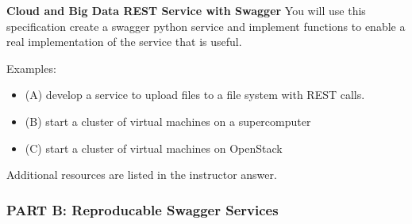\begin{exercise} {\bf Cloud and Big Data REST Service with Swagger}
 You will use this specification create a swagger python service and
 implement functions to enable a real implementation of the service
 that is useful.

 
Examples:

\begin{itemize}
\smallskip
\item (A) develop a service to upload files to a file system with REST calls.

\item (B) start a cluster of virtual machines on a supercomputer

\item (C) start a cluster of virtual machines on OpenStack

\end{itemize}


Additional resources are listed in the instructor answer. 
\end{exercise}

\subsubsection{PART B: Reproducable Swagger Services}

